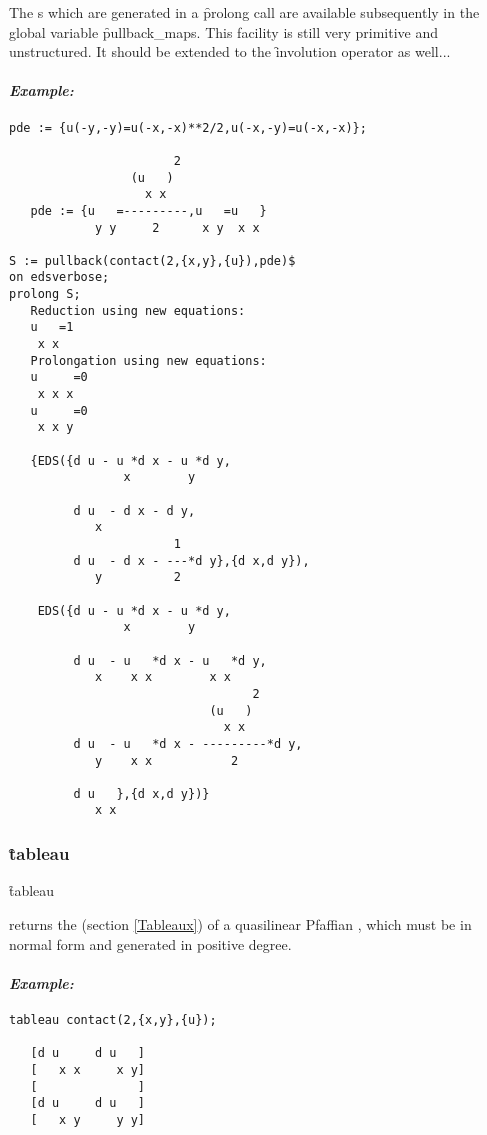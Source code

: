 The s which are generated in a \f{prolong} call are available
subsequently in the global variable \f{pullback\_maps}. This facility is
still very primitive and unstructured. It should be extended to the
\f{involution} operator as well...

\paragraph{\textit{Example:}}
\begin{verbatim}
pde := {u(-y,-y)=u(-x,-x)**2/2,u(-x,-y)=u(-x,-x)};

                       2
                 (u   )
                   x x
   pde := {u   =---------,u   =u   }
            y y     2      x y  x x

S := pullback(contact(2,{x,y},{u}),pde)$
on edsverbose;
prolong S;
   Reduction using new equations:
   u   =1
    x x
   Prolongation using new equations:
   u     =0
    x x x
   u     =0
    x x y

   {EDS({d u - u *d x - u *d y,
                x        y

         d u  - d x - d y,
            x
                       1
         d u  - d x - ---*d y},{d x,d y}),
            y          2

    EDS({d u - u *d x - u *d y,
                x        y

         d u  - u   *d x - u   *d y,
            x    x x        x x
                                  2
                            (u   )
                              x x
         d u  - u   *d x - ---------*d y,
            y    x x           2

         d u   },{d x,d y})}
            x x
\end{verbatim}

\subsubsection{\f{tableau}}
\label{tableau}

\hypertarget{operator:TABLEAU}{}
\begin{syntax}
	\f{tableau} 
\end{syntax}
returns the  (section \ref{Tableaux}) of a quasilinear
Pfaffian , which must be in normal form and generated in positive
degree.

\paragraph{\textit{Example:}}
\begin{verbatim}
tableau contact(2,{x,y},{u});

   [d u     d u   ]
   [   x x     x y]
   [              ]
   [d u     d u   ]
   [   x y     y y]
\end{verbatim}

